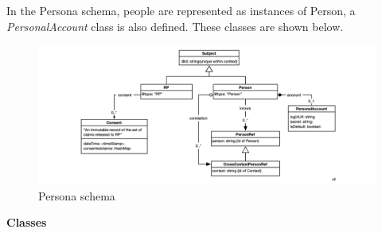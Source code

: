 \documentclass[11pt, oneside]{article}   	%
\begin{document}
In the Persona schema, people are represented as instances of Person, a \emph{PersonalAccount} class is also defined. These classes are shown below. 

\begin{figure}[htbp]
\includegraphics[width=\textwidth]{./images/persona-classes.png}
\caption{Persona schema}
\end{figure}

\textbf{Classes}
\end{document}

